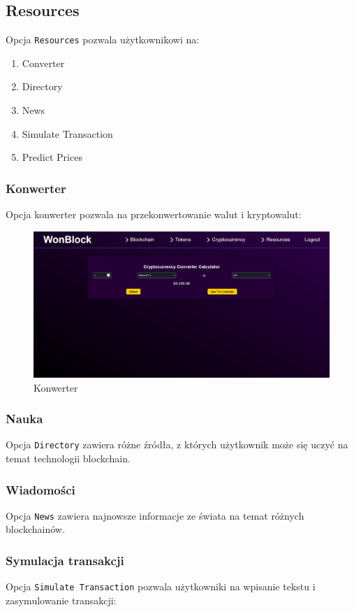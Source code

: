\subsection{Resources}
Opcja \texttt{Resources} pozwala użytkownikowi na:
\begin{enumerate}
    \item Converter
    \item Directory
    \item News
    \item Simulate Transaction
    \item Predict Prices
\end{enumerate}
\subsubsection{Konwerter} 
Opcja konwerter pozwala na przekonwertowanie walut i kryptowalut:
\begin{figure}[htb]
    \centering
    \includegraphics[width=0.8\linewidth]{./instrukcja/Converter.png}
    \caption{Konwerter}
    \label{fig:Konwerter}
\end{figure}

\subsubsection{Nauka}
Opcja \texttt{Directory} zawiera różne źródła, z których użytkownik może się uczyć na temat technologii blockchain.
\subsubsection{Wiadomości}
Opcja \texttt{News} zawiera najnowsze informacje ze świata na temat różnych blockchainów.
\subsubsection{Symulacja transakcji}
Opcja \texttt{Simulate Transaction} pozwala użytkowniki na wpisanie tekstu i zasymulowanie transakcji:

